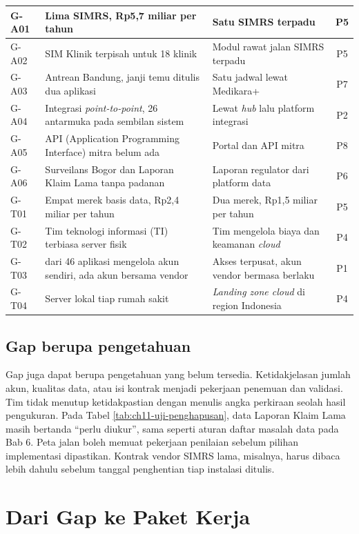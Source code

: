 \begin{table}[!htb]
\begin{tabularx}{\textwidth}{l>{\raggedright\arraybackslash}X>{\raggedright\arraybackslash}Xc}
    G-A01 & Lima SIMRS, Rp5,7 miliar per tahun & Satu SIMRS terpadu & P5 \\ \hline
    G-A02 & SIM Klinik terpisah untuk 18 klinik & Modul rawat jalan SIMRS terpadu & P5 \\ \hline
    G-A03 & Antrean Bandung, janji temu ditulis dua aplikasi & Satu jadwal lewat Medikara+ & P7 \\ \hline
    G-A04 & Integrasi \textit{point-to-point}, 26 antarmuka pada sembilan sistem & Lewat \textit{hub} lalu platform integrasi & P2 \\ \hline
    G-A05 & API (Application Programming Interface) mitra belum ada & Portal dan API mitra & P8 \\ \hline
    G-A06 & Surveilans Bogor dan Laporan Klaim Lama tanpa padanan & Laporan regulator dari platform data & P6 \\ \hline
    G-T01 & Empat merek basis data, Rp2,4 miliar per tahun & Dua merek, Rp1,5 miliar per tahun & P5 \\ \hline
    G-T02 & Tim teknologi informasi (TI) terbiasa server fisik & Tim mengelola biaya dan keamanan \textit{cloud} & P4 \\ \hline
    G-T03 & 31 dari 46 aplikasi mengelola akun sendiri, ada akun bersama vendor & Akses terpusat, akun vendor bermasa berlaku & P1 \\ \hline
    G-T04 & Server lokal tiap rumah sakit & \textit{Landing zone cloud} di region Indonesia & P4 \\ \hline
  \end{tabularx}
\end{table}

\subsection*{Gap berupa pengetahuan}

Gap juga dapat berupa pengetahuan yang belum tersedia. Ketidakjelasan jumlah akun, kualitas
data, atau isi kontrak menjadi pekerjaan penemuan dan validasi. Tim tidak menutup
ketidakpastian dengan menulis angka perkiraan seolah hasil pengukuran. Pada Tabel
\ref{tab:ch11-uji-penghapusan}, data Laporan Klaim Lama masih bertanda ``perlu diukur'',
sama seperti aturan daftar masalah data pada Bab 6. Peta jalan boleh memuat pekerjaan
penilaian sebelum pilihan implementasi dipastikan. Kontrak vendor SIMRS lama, misalnya, harus
dibaca lebih dahulu sebelum tanggal penghentian tiap instalasi ditulis.

\section{Dari Gap ke Paket Kerja}


